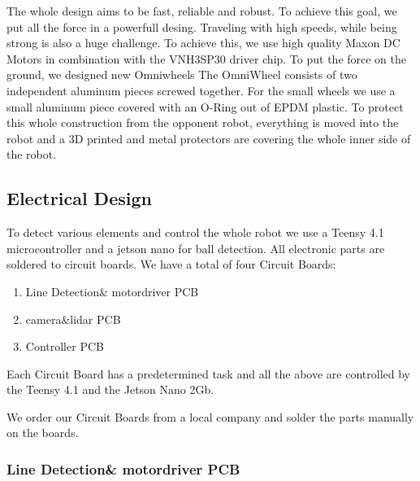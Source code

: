 \documentclass{scrartcl}
\begin{document}

The whole design aims to be fast, reliable and robust. To achieve this goal,
 we put all the force in a powerfull desing.
\newline
Traveling with high speeds, while being strong is also a huge challenge. To achieve this, we use high quality
Maxon DC Motors in combination with the VNH3SP30 driver chip. To put the force on the ground, we designed
new Omniwheels%
The OmniWheel consists of two independent aluminum pieces screwed together. For the small wheels we use a small
aluminum piece covered with an O-Ring out of EPDM plastic.
\newline
To protect this whole construction from the opponent robot, everything is moved into the robot and a 3D
printed and metal protectors are covering the whole inner side of the robot.
\newpage


\subsection{Electrical Design}
To detect various elements and control the whole robot we use a Teensy 4.1 microcontroller and a jetson nano
for ball detection. All electronic parts are soldered to circuit boards.
\newline
We have a total of four Circuit Boards:
\begin{enumerate}
    \item{Line Detection\& motordriver PCB}
    \item{camera\&lidar PCB}
    \item{Controller PCB}
\end{enumerate}
Each Circuit Board has a predetermined task and all the above are controlled by the Teensy 4.1 
and the Jetson Nano 2Gb.

We order our Circuit Boards from a local company and solder the parts manually on the boards.

\subsubsection{Line Detection\& motordriver PCB}

\end{document}
